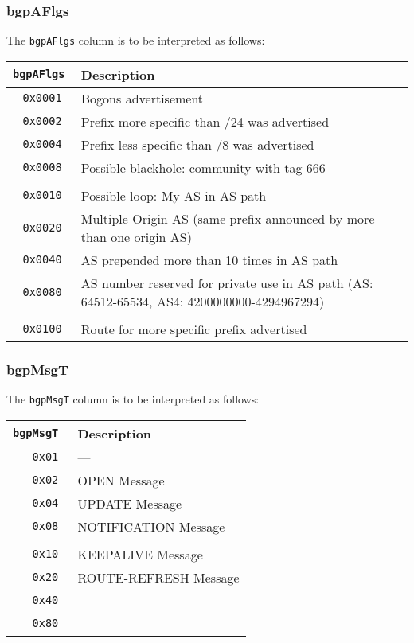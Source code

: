 \documentclass[documentation]{subfiles}
\begin{document}
\subsubsection{bgpAFlgs}\label{bgpAFlgs}
The {\tt bgpAFlgs} column is to be interpreted as follows:
\begin{longtable}{>{\tt}rl}
    \toprule
    {\bf bgpAFlgs} & {\bf Description}\\
    \midrule\endhead%
    0x0001 & Bogons advertisement\\
    0x0002 & Prefix more specific than /24 was advertised\\
    0x0004 & Prefix less specific than /8 was advertised\\
    0x0008 & Possible blackhole: community with tag 666\\
    \\
    0x0010 & Possible loop: My AS in AS path\\
    0x0020 & Multiple Origin AS (same prefix announced by more than one origin AS)\\
    0x0040 & AS prepended more than 10 times in AS path\\
    0x0080 & AS number reserved for private use in AS path {\small (AS: 64512-65534, AS4: 4200000000-4294967294)}\\
    \\
    0x0100 & Route for more specific prefix advertised\\
    \bottomrule
\end{longtable}

\subsubsection{bgpMsgT}\label{bgpMsgT}
The {\tt bgpMsgT} column is to be interpreted as follows:
\begin{longtable}{>{\tt}rl}
    \toprule
    {\bf bgpMsgT} & {\bf Description}\\
    \midrule\endhead%
    0x01 & ---\\
    0x02 & OPEN Message\\
    0x04 & UPDATE Message\\
    0x08 & NOTIFICATION Message\\
    \\
    0x10 & KEEPALIVE Message\\
    0x20 & ROUTE-REFRESH Message\\
    0x40 & ---\\
    0x80 & ---\\
    \bottomrule
\end{longtable}
\end{document}
